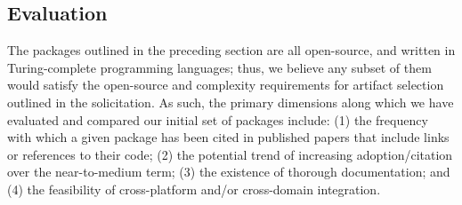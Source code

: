 \documentclass{article}
\begin{document}



\subsection{Evaluation}
The packages outlined in the preceding section are all open-source, and written in Turing-complete programming languages; thus, we believe any subset of them would satisfy the open-source and complexity requirements for artifact selection outlined in the solicitation. As such, the primary dimensions along which we have evaluated and compared our initial set of packages include: (1) the frequency with which a given package has been cited in published papers that include links or references to their code; (2) the potential trend of increasing adoption/citation over the near-to-medium term; (3) the existence of thorough documentation; and (4) the feasibility of cross-platform and/or cross-domain integration.






\end{document}
